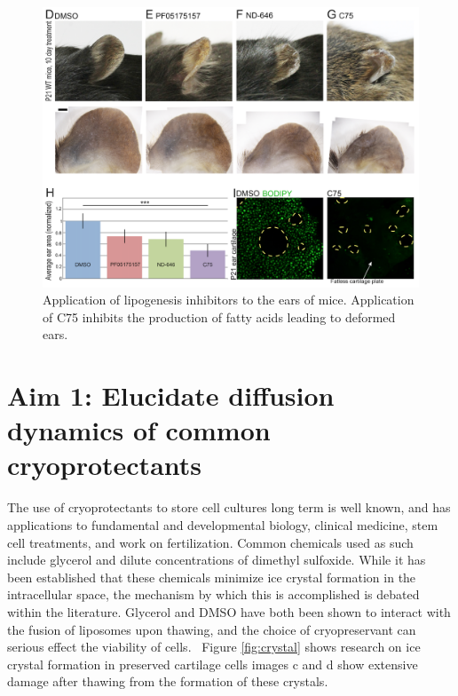 \begin{figure}
    \centering
    \includegraphics[width=\textwidth]{Figures/paperfig.png}
    \caption{Application of lipogenesis inhibitors to the ears of mice.  Application of C75 inhibits the production of fatty acids leading to deformed ears.}
    \label{fig:pubfig}
\end{figure}

\section{Aim 1: Elucidate diffusion dynamics of common cryoprotectants}
   The use of cryoprotectants to store cell cultures long term is well known, and has applications to fundamental and developmental biology, clinical medicine, stem cell treatments, and work on fertilization.\cite{EGLI2003352,SCHELLANDER1994909,JACOB198614}  Common chemicals used as such include glycerol and dilute concentrations of dimethyl sulfoxide.\cite{Pegg:2002aa}  While it has been established that these chemicals minimize ice crystal formation in the intracellular space, the mechanism by which this is accomplished is debated within the literature.\cite{nucleation1993} Glycerol and DMSO have both been shown to interact with the fusion of liposomes upon thawing, and the choice of cryopreservant can serious effect the viability of cells.~\cite{ANCHORDOGUY1987324, SCHELLANDER1994909} Figure \ref{fig:crystal} shows research on ice crystal formation in preserved cartilage cells images c and d show extensive damage after thawing from the formation of these crystals.~\cite{PEGG2010S36}
   
